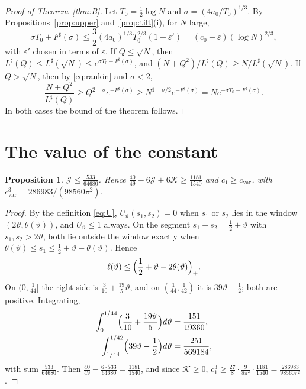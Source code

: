 \documentclass[aps,prd,twocolumn,superscriptaddress,nofootinbib,longbibliography,floatfix,showkeys,nobalancelastpage,amsmath,amssymb,10pt]{revtex4-2}
\theoremstyle{plain}
\newtheorem{proposition}[theorem]{Proposition}
\theoremstyle{definition}
\theoremstyle{plain}
\newcommand{\eps}{\varepsilon}
\newcommand{\Jc}{\mathcal{J}}
\newcommand{\Kc}{\mathcal{K}}
\begin{document}
\begin{proof}[Proof of Theorem~\ref{thm:B}]
Let $T_0=\frac12\log N$ and $\sigma=(4a_0/T_0)^{1/3}$. By Propositions~\ref{prop:upper} and~\ref{prop:tilt}(i), for $N$ large,
\[
\sigma T_0+F^\sharp(\sigma)\le\frac32(4a_0)^{1/3}T_0^{2/3}(1+\eps')=(c_0+\eps)(\log N)^{2/3},
\]
with $\eps'$ chosen in terms of $\eps$. If $Q\le\sqrt N$, then $L^\sharp(Q)\le L^\sharp(\sqrt N)\le e^{\sigma T_0+F^\sharp(\sigma)}$, and $(N+Q^2)/L^\sharp(Q)\ge N/L^\sharp(\sqrt N)$. If $Q>\sqrt N$, then by \eqref{eq:rankin} and $\sigma<2$,
\[
\frac{N+Q^2}{L^\sharp(Q)}\ge Q^{2-\sigma}e^{-F^\sharp(\sigma)}\ge N^{1-\sigma/2}e^{-F^\sharp(\sigma)}=Ne^{-\sigma T_0-F^\sharp(\sigma)}.
\]
In both cases the bound of the theorem follows.
\end{proof}

\section{The value of the constant}\label{sec:constant}

\begin{proposition}\label{prop:var}
$\Jc\le\frac{533}{64680}$. Hence $\frac{40}{49}-6\Jc+6\Kc\ge\frac{1181}{1540}$ and $c_1\ge c_{\mathrm{var}}$, with $c_{\mathrm{var}}^3=286983/(98560\pi^2)$.
\end{proposition}

\begin{proof}
By the definition \eqref{eq:U}, $U_\vartheta(s_1,s_2)=0$ when $s_1$ or $s_2$ lies in the window $(2\vartheta,\theta(\vartheta))$, and $U_\vartheta\le1$ always. On the segment $s_1+s_2=\frac12+\vartheta$ with $s_1,s_2>2\vartheta$, both lie outside the window exactly when $\theta(\vartheta)\le s_1\le\frac12+\vartheta-\theta(\vartheta)$. Hence
\[
\ell(\vartheta)\le\Bigl(\frac12+\vartheta-2\theta(\vartheta)\Bigr)_+.
\]
On $(0,\frac1{44}]$ the right side is $\frac3{10}+\frac{19}5\vartheta$, and on $(\frac1{44},\frac1{42})$ it is $39\vartheta-\frac12$; both are positive. Integrating,
\begin{align*}
\int_0^{1/44}\Bigl(\frac3{10}+\frac{19\vartheta}5\Bigr)d\vartheta&=\frac{151}{19360},\\
\int_{1/44}^{1/42}\Bigl(39\vartheta-\frac12\Bigr)d\vartheta&=\frac{251}{569184},
\end{align*}
with sum $\frac{533}{64680}$. Then $\frac{40}{49}-\frac{6\cdot533}{64680}=\frac{1181}{1540}$, and since $\Kc\ge0$, $c_1^3\ge\frac{27}8\cdot\frac9{8\pi^2}\cdot\frac{1181}{1540}=\frac{286983}{98560\pi^2}$.
\end{proof}
\end{document}
